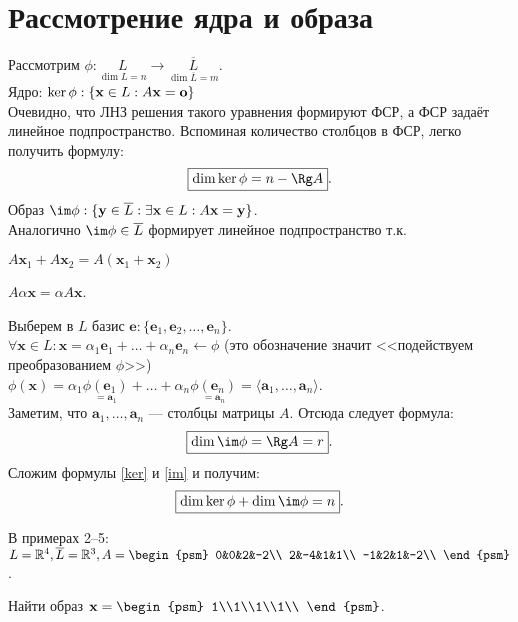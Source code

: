 \section{Рассмотрение ядра и образа}
Рассмотрим $\phi: \underset{\dim L=n}{L}\rightarrow \underset{\dim \overline{L}=m}{\overline{L}}$.\\
Ядро: $\ker\phi: \{\textbf{x} \in L: A\textbf{\textbf{x}}=\textbf{o}\}$\\
Очевидно, что ЛНЗ решения такого уравнения формируют ФСР, а ФСР задаёт линейное подпространство. Вспоминая количество столбцов в ФСР, легко получить формулу:
\begin{equation}
\boxed{\dim\ker\phi=n-\Rg A}.
\label{ker}
\end{equation}
Образ $\im\phi: \{\textbf{y} \in \overline{L}:\exists \textbf{x}\in L: A\textbf{x}=\textbf{y}\}$.\\
Аналогично $\im\phi \in \overline{L}$ формирует линейное подпространство т.к.
\begin{center}
$
A\textbf{x$_1$}+A\textbf{x$_2$}=A(\textbf{x$_1$}+\textbf{x$_2$})$

$A\alpha \textbf{x}=\alpha A\textbf{x}$.
\end{center}
Выберем в $L$ базис $\textbf{e}:\{\textbf{e$_1$}, \textbf{e$_2$}, \dots, \textbf{e$_n$}\}$.\\
$\forall \textbf{x} \in L: \textbf{x}=\alpha_1\textbf{e$_1$}+\dots+\alpha_n\textbf{e$_n$} \leftarrow \phi$ (это обозначение значит <<подействуем преобразованием $\phi$>>)\\
$\phi(\textbf{x})=\alpha_1 \underset{=\textbf{a$_1$}}{\phi(\textbf{e$_1$})}+\dots+\alpha_n \underset{=\textbf{a$_n$}}{\phi(\textbf{e$_n$})}=\langle \textbf{a$_1$},\dots, \textbf{a$_n$}\rangle$.\\
Заметим, что $\textbf{a$_1$},\dots, \textbf{a$_n$}$ --- столбцы матрицы $A$. Отсюда следует формула:
\begin{equation}
\boxed{\dim\im\phi=\Rg A=r}.
\label{im}
\end{equation}
Сложим формулы \eqref{ker} и \eqref{im} и получим:
\begin{equation}
\boxed{\dim\ker\phi+\dim\im\phi=n}.
\end{equation}
\begin{center}
В примерах 2--5: $L=\mathbb{R}^4, \overline{L}=\mathbb{R}^3, A=\begin{psm}
0&0&2&-2\\
2&-4&1&1\\
-1&2&1&-2\\
\end{psm}$.
\end{center}
\begin{prim}
Найти образ $\textbf{x}=\begin{psm}
	1\\1\\1\\1\\
\end{psm}$.
\end{prim}\\

